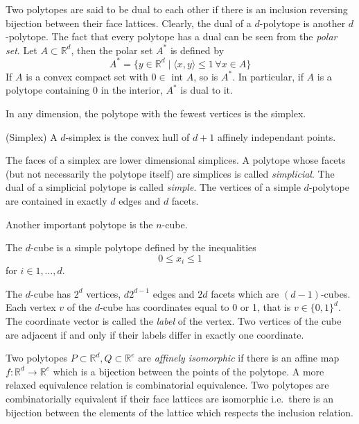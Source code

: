 
Two polytopes are said to be dual to each other if there is an inclusion 
reversing bijection between their face lattices. Clearly, the dual of a 
$d$-polytope is another $d$-polytope. The fact that every polytope has a dual 
can be seen from the \textit{polar set}. Let $A\subset \mathbb{R}^d$, then the 
polar set $A^*$ is defined by
\begin{equation}
 A^* = \{y \in \mathbb{R}^d \mid \langle x,y\rangle \leq 1 \, \forall  x  \in A 
\} 
\end{equation}
If $A$ is a convex compact set with $0 \in$ int $A$, so is $A^*$. In 
particular, if $A$ is a polytope containing $0$ in the interior, $A^*$ is dual 
to it. 

In any dimension, the polytope with the fewest vertices is the simplex. 
\begin{definition}
 (Simplex) A $d$-simplex is the convex hull of $d+1$ affinely independant 
points.
\end{definition}
The faces of a simplex are lower dimensional simplices. A polytope whose facets 
(but not necessarily the polytope itself) are simplices is called 
\textit{simplicial}. The dual of a simplicial polytope is called 
\textit{simple}. The vertices of a simple $d$-polytope are contained in exactly 
$d$ edges and $d$ facets. 

Another important polytope is the $n$-cube.

\begin{definition}
 The $d$-cube is a simple polytope defined by the inequalities
\begin{equation}
 0 \leq x_i \leq 1 
\end{equation}
for $i \in 1,\dots, d$.
\end{definition}
The $d$-cube has $2^d$ vertices, $d2^{d-1}$ edges and $2d$ facets which
are $(d-1)$-cubes. Each vertex $v$ of the $d$-cube has coordinates equal to 0 
or 1, that is $v\in \{0,1\}^d$. The coordinate vector is called the 
\textit{label} of the vertex. Two vertices of the cube are adjacent if and only 
if their labels differ in exactly one coordinate.

Two polytopes $P\subset \mathbb{R}^d, Q \subset \mathbb{R}^e$ are 
\textit{affinely isomorphic} if there is an affine map $f: \mathbb{R}^d 
\rightarrow \mathbb{R}^e$ which is a bijection between the points of the 
polytope. A more relaxed equivalence relation is combinatorial equivalence. Two 
polytopes are combinatorially equivalent if their face lattices are isomorphic 
i.e.\ there is an bijection between the elements of the lattice which respects 
the inclusion relation. 

